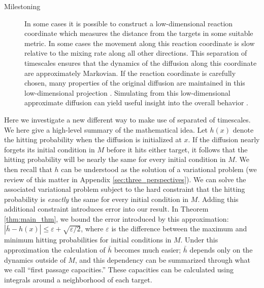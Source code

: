 \documentclass[12pt, nofootinbib,english, amsmath, amssymb, aps, priprint, graphicx,floatfix,draft]{revtex4-1}
\theoremstyle{plain}
\theoremstyle{definition}
\theoremstyle{plain}
\begin{document}
\begin{description}
    \item[Milestoning] In some cases it is possible to construct a low-dimensional reaction coordinate which measures the distance from the targets in some suitable metric.  In some cases the movement along this reaction coordinate is slow relative to the mixing rate along all other directions.  This separation of timescales ensures that the dynamics of the diffusion along this coordinate are approximately Markovian.  If the reaction coordinate is carefully chosen, many properties of the original diffusion are maintained in this low-dimensional projection \cite{E2006-fm}.  Simulating from this low-dimensional approximate diffusion can yield useful insight into the overall behavior \cite{Bello-Rivas2015-ld}.  
\end{description}

Here we investigate a new different way to make use of separated of timescales.  We here give a high-level summary of the mathematical idea.  Let $h(x)$ denote the hitting probability when the diffusion is initialized at $x$.  If the diffusion nearly forgets its initial condition in $M$ before it hits either target, it follows that the hitting probability will be nearly the same for every initial condition in $M$.  We then recall that $h$ can be understood as the solution of a variational problem (we review of this matter in Appendix \ref{sec:three_perspectives}).  We can solve the associated variational problem subject to the hard constraint that the hitting probability is \emph{exactly} the same for every initial condition in $M$.  Adding this additional constraint introduces error into our result.  In Theorem \ref{thm:main_thm}, we bound the error introduced by this approximation: $|\bar h - h(x) |\leq \varepsilon + \sqrt{\varepsilon/2}$, where $\varepsilon$ is the difference between the maximum and minimum hitting probabilities for initial conditions in $M$.  Under this approximation the calculation of $\bar h$ becomes much easier; $\bar h$ depends only on the dynamics outside of $M$, and this dependency can be summarized through what we call ``first passage capacities.''  These capacities can be calculated using integrals around a neighborhood of each target.  
\end{document}
